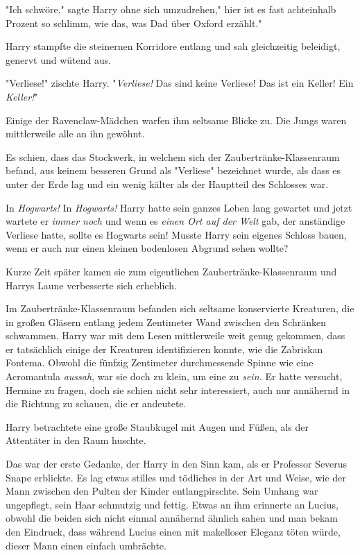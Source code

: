 {"Ich schwöre," sagte Harry ohne sich umzudrehen," hier ist es fast achteinhalb Prozent so schlimm, wie das, was Dad über Oxford erzählt."

\later

Harry stampfte die steinernen Korridore entlang und sah gleichzeitig beleidigt, genervt und wütend aus.

"Verliese!" zischte Harry. "\emph{Verliese!} Das sind keine Verliese! Das ist ein Keller! Ein \emph{Keller!}"

Einige der Ravenclaw-Mädchen warfen ihm seltsame Blicke zu. Die Jungs waren mittlerweile alle an ihn gewöhnt.

Es schien, dass das Stockwerk, in welchem sich der Zaubertränke-Klassenraum befand, aus keinem besseren Grund als "Verliese" bezeichnet wurde, als dass es unter der Erde lag und ein wenig kälter als der Hauptteil des Schlosses war.

In \emph{Hogwarts!} In \emph{Hogwarts!} Harry hatte sein ganzes Leben lang gewartet und jetzt wartete er \emph{immer noch} und wenn es \emph{einen Ort auf der Welt} gab, der anständige Verliese hatte, sollte es Hogwarts sein! Musste Harry sein eigenes Schloss bauen, wenn er auch nur einen kleinen bodenlosen Abgrund sehen wollte?

Kurze Zeit später kamen sie zum eigentlichen Zaubertränke-Klassenraum und Harrys Laune verbesserte sich erheblich.

Im Zaubertränke-Klassenraum befanden sich seltsame konservierte Kreaturen, die in großen Gläsern entlang jedem Zentimeter Wand zwischen den Schränken schwammen. Harry war mit dem Lesen mittlerweile weit genug gekommen, dass er tatsächlich einige der Kreaturen identifizieren konnte, wie die Zabriskan Fontema. Obwohl die fünfzig Zentimeter durchmessende Spinne wie eine Acromantula \emph{aussah}, war sie doch zu klein, um eine zu \emph{sein.} Er hatte versucht, Hermine zu fragen, doch sie schien nicht sehr interessiert, auch nur annähernd in die Richtung zu schauen, die er andeutete.

Harry betrachtete eine große Staubkugel mit Augen und Füßen, als der Attentäter in den Raum huschte.

Das war der erste Gedanke, der Harry in den Sinn kam, als er Professor Severus Snape erblickte. Es lag etwas stilles und tödliches in der Art und Weise, wie der Mann zwischen den Pulten der Kinder entlangpirschte. Sein Umhang war ungepflegt, sein Haar schmutzig und fettig. Etwas an ihm erinnerte an Lucius, obwohl die beiden sich nicht einmal annähernd ähnlich sahen und man bekam den Eindruck, dass während Lucius einen mit makelloser Eleganz töten würde, dieser Mann einen einfach umbrächte.

}
